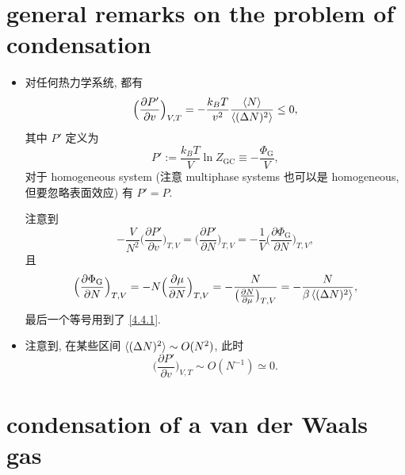 \section{general remarks on the problem of condensation}
\begin{itemize}
	\item 对任何热力学系统, 都有
	\begin{equation}
		\Big( \frac{\partial P'}{\partial v} \Big)_{V, T} = - \frac{k_B T}{v^2} \frac{\braket{N}}{\braket{(\Delta N)^2}} \leq 0,
	\end{equation}
	其中 $P'$ 定义为
	\begin{equation}
		P' := \frac{k_B T}{V} \ln Z_\text{GC} \equiv - \frac{\Phi_\text{G}}{V},
	\end{equation}
	对于 homogeneous system (注意 multiphase systems 也可以是 homogeneous, 但要忽略表面效应) 有 $P' = P$.
	
	\begin{tcolorbox}[title=calculation:]
		注意到
		\begin{equation}
			- \frac{V}{N^2} \Big( \frac{\partial P'}{\partial v} \Big)_{T, V} = \Big( \frac{\partial P'}{\partial N} \Big)_{T, V} = - \frac{1}{V} \Big( \frac{\partial \Phi_\text{G}}{\partial N} \Big)_{T, V},
		\end{equation}
		且
		\begin{equation}
			\Big( \frac{\partial \Phi_\text{G}}{\partial N} \Big)_{T, V} = - N \Big( \frac{\partial \mu}{\partial N} \Big)_{T, V} = - \frac{N}{\big( \frac{\partial N}{\partial \mu} \big)_{T, V}} = - \frac{N}{\beta \braket{(\Delta N)^2}},
		\end{equation}
		最后一个等号用到了 \eqref{4.4.1}.
	\end{tcolorbox}
	
	\item 注意到, 在某些区间 $\braket{(\Delta N)^2} \sim O(N^2)$, 此时
	\begin{equation}
		\Big( \frac{\partial P'}{\partial v} \Big)_{V, T} \sim O(N^{- 1}) \simeq 0.
	\end{equation}
\end{itemize}

\section{condensation of a van der Waals gas}
